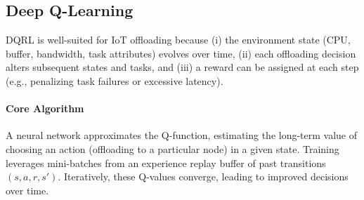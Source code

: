 \documentclass[preprint,12pt]{elsarticle}
\begin{document}
\subsection{Deep Q-Learning}
\label{subsec:dqrl}

DQRL is well-suited for IoT offloading because (i) the environment state (CPU, buffer, bandwidth, task attributes) evolves over time, (ii) each offloading decision alters subsequent states and tasks, and (iii) a reward can be assigned at each step (e.g., penalizing task failures or excessive latency).

\paragraph{Core Algorithm}
A neural network approximates the Q-function, estimating the long-term value of choosing an action (offloading to a particular node) in a given state. Training leverages mini-batches from an experience replay buffer of past transitions \((s,a,r,s')\). Iteratively, these Q-values converge, leading to improved decisions over time.
\end{document}
